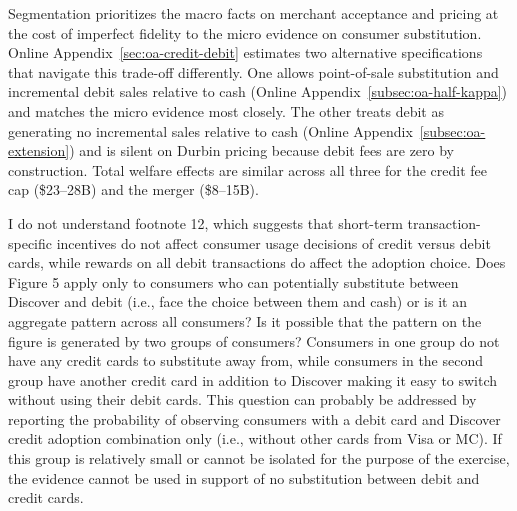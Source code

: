 \documentclass[main.tex]{subfiles}
\begin{document}
\begin{refsection}
Segmentation prioritizes the macro facts on merchant acceptance and pricing at the cost of imperfect fidelity to the micro evidence on consumer substitution.
Online Appendix~\ref{sec:oa-credit-debit} estimates two alternative specifications that navigate this trade-off differently.
One allows point-of-sale substitution and incremental debit sales relative to cash (Online Appendix~\ref{subsec:oa-half-kappa}) and matches the micro evidence most closely.
The other treats debit as generating no incremental sales relative to cash (Online Appendix~\ref{subsec:oa-extension}) and is silent on Durbin pricing because debit fees are zero by construction.
Total welfare effects are similar across all three for the credit fee cap (\$23--28B) and the merger (\$8--15B).

\begin{refcommentnoclear}
I do not understand footnote 12, which suggests that short-term transaction-specific incentives do not affect consumer usage decisions of credit versus debit cards, while rewards on all debit transactions do affect the adoption choice.
Does Figure 5 apply only to consumers who can potentially substitute between Discover and debit (i.e., face the choice between them and cash) or is it an aggregate pattern across all consumers?
Is it possible that the pattern on the figure is generated by two groups of consumers?
Consumers in one group do not have any credit cards to substitute away from, while consumers in the second group have another credit card in addition to Discover making it easy to switch without using their debit cards.
This question can probably be addressed by reporting the probability of observing consumers with a debit card and Discover credit adoption combination only (i.e., without other cards from Visa or MC).
If this group is relatively small or cannot be isolated for the purpose of the exercise, the evidence cannot be used in support of no substitution between debit and credit cards.

\end{refcommentnoclear}


\end{refsection}
\end{document}
